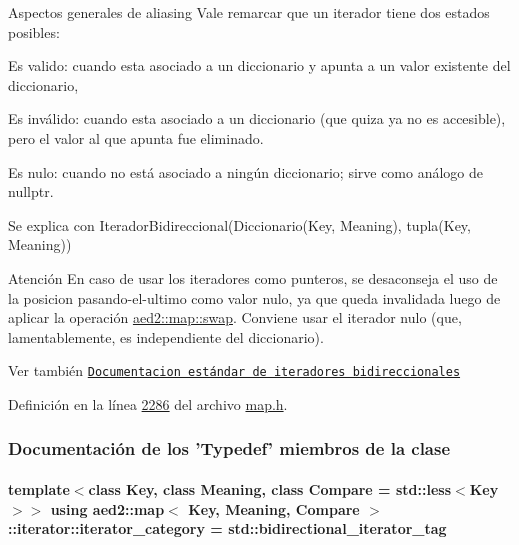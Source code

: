 \begin{DoxyParagraph}{Aspectos generales de aliasing}
Vale remarcar que un iterador tiene dos estados posibles\-:
\begin{DoxyEnumerate}
\item Es valido\-: cuando esta asociado a un diccionario y apunta a un valor existente del diccionario,
\item Es inválido\-: cuando esta asociado a un diccionario (que quiza ya no es accesible), pero el valor al que apunta fue eliminado.
\item Es nulo\-: cuando no está asociado a ningún diccionario; sirve como análogo de {\ttfamily nullptr}. 
\end{DoxyEnumerate}
\end{DoxyParagraph}


\begin{DoxyParagraph}{Se explica con}
Iterador\-Bidireccional(Diccionario(Key, Meaning), tupla(Key, Meaning))
\end{DoxyParagraph}
\begin{DoxyAttention}{Atención}
En caso de usar los iteradores como punteros, se desaconseja el uso de la posicion pasando-\/el-\/ultimo como valor nulo, ya que queda invalidada luego de aplicar la operación \hyperlink{classaed2_1_1map_a43ddb71cc91e5c6021a7a1f243d6cc4a_a43ddb71cc91e5c6021a7a1f243d6cc4a}{aed2\-::map\-::swap}. Conviene usar el iterador nulo (que, lamentablemente, es independiente del diccionario).
\end{DoxyAttention}
\begin{DoxySeeAlso}{Ver también}
\href{http://en.cppreference.com/w/cpp/concept/BidirectionalIterator}{\tt Documentacion estándar de iteradores bidireccionales} 
\end{DoxySeeAlso}


Definición en la línea \hyperlink{map_8h_source_l02286}{2286} del archivo \hyperlink{map_8h_source}{map.\-h}.



\subsubsection{Documentación de los 'Typedef' miembros de la clase}
\hypertarget{classaed2_1_1map_1_1iterator_a709df3d8aef6fd1eeb839616b554ff0b_a709df3d8aef6fd1eeb839616b554ff0b}{
\paragraph[{iterator\-\_\-category}]{\setlength{\rightskip}{0pt plus 5cm}template$<$class Key, class Meaning, class Compare = std\-::less$<$\-Key$>$$>$ using {\bf aed2\-::map}$<$ Key, Meaning, Compare $>$\-::{\bf iterator\-::iterator\-\_\-category} =  std\-::bidirectional\-\_\-iterator\-\_\-tag}}\label{classaed2_1_1map_1_1iterator_a709df3d8aef6fd1eeb839616b554ff0b_a709df3d8aef6fd1eeb839616b554ff0b}


